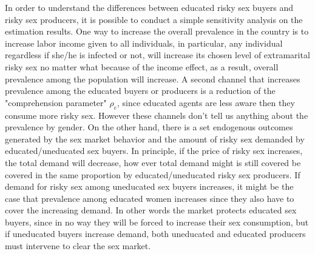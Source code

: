 In order to understand the differences between educated risky sex buyers and risky sex producers, it is possible to conduct a simple sensitivity analysis on the estimation results. One way to increase the overall prevalence in the country is to increase labor income given to all individuals, in particular, any individual regardless if she/he is infected or not, will increase its chosen level of extramarital risky sex no matter what because of the income effect, as a result, overall prevalence among the population will increase. A second channel that increases prevalence among the educated buyers or producers is a reduction of the "comprehension parameter" $\rho_{e}$, since educated agents are less aware then they consume more risky sex. However these channels don't tell us anything about the prevalence by gender. On the other hand, there is a set endogenous outcomes generated by the sex market behavior and the amount of risky sex demanded by educated/uneducated sex buyers. In principle, if the price of risky sex increases, the total demand will decrease, how ever total demand might is still covered be covered in the same proportion by educated/uneducated risky sex producers. If demand for risky sex among uneducated sex buyers increases, it might be the case that prevalence among educated women increases since they also have to cover the increasing demand. In other words the market protects educated sex buyers, since in no way they will be forced to increase their sex consumption, but if uneducated buyers increase demand, both uneducated and educated producers must intervene to clear the sex market.    